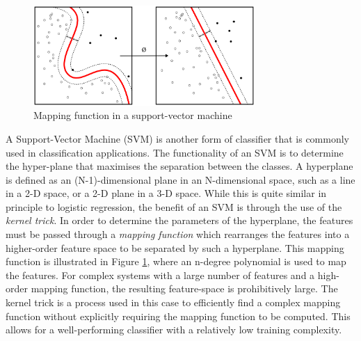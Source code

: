 \par
\begin{figure}[ht]
    \centering
    \includegraphics[width=0.75\textwidth]{02-Background/Kernel_Machine.png}
    \caption{Mapping function in a support-vector machine \cite{svmDiagWc}}
    \label{fig:svmMapping}
\end{figure}
A Support-Vector Machine (SVM) is another form of classifier that is commonly used in classification applications. The functionality of an SVM is to determine the hyper-plane that maximises the separation between the classes. A hyperplane is defined as an (N-1)-dimensional plane in an N-dimensional space, such as a line in a 2-D space, or a 2-D plane in a 3-D space. While this is quite similar in principle to logistic regression, the benefit of an SVM is through the use of the \emph{kernel trick}. In order to determine the parameters of the hyperplane, the features must be passed through a \emph{mapping function} which rearranges the features into a higher-order feature space to be separated by such a hyperplane. This mapping function is illustrated in Figure \ref{fig:svmMapping}, where an n-degree polynomial is used to map the features. For complex systems with a large number of features and a high-order mapping function, the resulting feature-space is prohibitively large. The kernel trick is a process used in this case to efficiently find a complex mapping function without explicitly requiring the mapping function to be computed. This allows for a well-performing classifier with a relatively low training complexity.

\par

